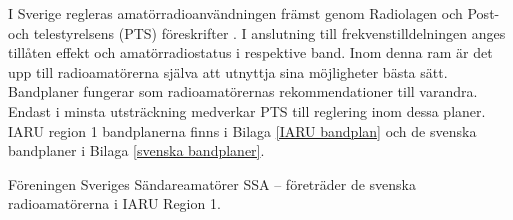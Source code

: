 I Sverige regleras amatörradioanvändningen främst genom Radiolagen och Post- och
telestyrelsens (PTS) föreskrifter \cite{PTSFS2015:4}.
I anslutning till frekvenstilldelningen anges tillåten effekt och
amatörradiostatus i respektive band.
Inom denna ram är det upp till radioamatörerna själva att utnyttja sina
möjligheter bästa sätt.
Bandplaner fungerar som radioamatörernas rekommendationer till varandra.
Endast i minsta utsträckning medverkar PTS till reglering inom dessa planer.
IARU region 1 bandplanerna finns i Bilaga \ref{IARU bandplan} och de
svenska bandplaner i Bilaga \ref{svenska bandplaner}.

Föreningen Sveriges Sändareamatörer SSA -- företräder de svenska
radioamatörerna i IARU Region 1.
